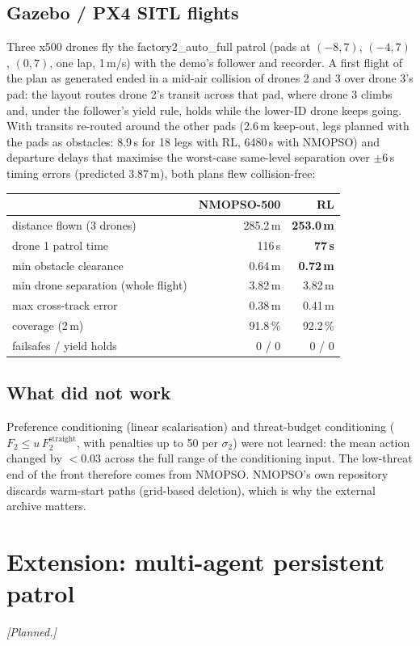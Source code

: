 \documentclass[conference]{IEEEtran}
\begin{document}
\subsection{Gazebo / PX4 SITL flights}
Three x500 drones fly the factory2\_auto\_full patrol (pads at $(-8,7)$, $(-4,7)$, $(0,7)$, one lap,
1\,m/s) with the demo's follower and recorder. A first flight of the plan as generated ended in a
mid-air collision of drones 2 and 3 over drone 3's pad: the layout routes drone 2's transit across
that pad, where drone 3 climbs and, under the follower's yield rule, holds while the lower-ID drone
keeps going. With transits re-routed around the other pads (2.6\,m keep-out, legs planned with the
pads as obstacles: 8.9\,s for 18 legs with RL, 6480\,s with NMOPSO) and departure delays that
maximise the worst-case same-level separation over $\pm6$\,s timing errors (predicted 3.87\,m),
both plans flew collision-free:
\begin{table}[h]\centering\small
\begin{tabular}{lrr}\toprule
 & NMOPSO-500 & RL \\\midrule
distance flown (3 drones) & 285.2\,m & \textbf{253.0\,m}\\
drone 1 patrol time & 116\,s & \textbf{77\,s}\\
min obstacle clearance & 0.64\,m & \textbf{0.72\,m}\\
min drone separation (whole flight) & 3.82\,m & 3.82\,m\\
max cross-track error & 0.38\,m & 0.41\,m\\
coverage (2\,m) & 91.8\,\% & 92.2\,\%\\
failsafes / yield holds & 0 / 0 & 0 / 0\\\bottomrule
\end{tabular}\end{table}

\subsection{What did not work}
Preference conditioning (linear scalarisation) and threat-budget conditioning ($F_2\le u\,F_2^{\text{straight}}$,
with penalties up to 50 per $\sigma_2$) were not learned: the mean action changed by $<0.03$ across the
full range of the conditioning input. The low-threat end of the front therefore comes from NMOPSO.
NMOPSO's own repository discards warm-start paths (grid-based deletion), which is why the external
archive matters.

\section{Extension: multi-agent persistent patrol}
\emph{[Planned.]}
\end{document}

